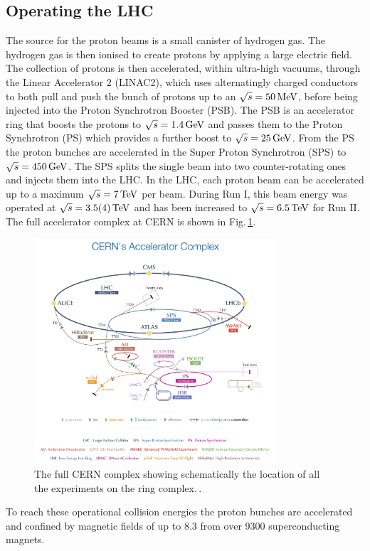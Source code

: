 \subsection{Operating the LHC}
\label{ssec:LHCoperation}

The source for the proton beams is a small canister of hydrogen gas. 
The hydrogen gas is then ionised to create protons by applying a large electric field.
The collection of protons is then accelerated, within ultra-high vacuums, through the Linear Accelerator 2 (LINAC2), which uses alternatingly charged conductors to both pull and push the bunch of protons up to an $\sqrt{s}=50\,\text{Me\hspace{-.08em}V}$, before being injected into the Proton Synchrotron Booster (PSB).
The PSB is an accelerator ring that boosts the protons to $\sqrt{s}=1.4\,\text{Ge\hspace{-.08em}V}$ and passes them to the Proton Synchrotron (PS) which provides a further boost to $\sqrt{s}=25\,\text{Ge\hspace{-.08em}V}$.
From the PS the proton bunches are accelerated in the Super Proton Synchrotron (SPS) to $\sqrt{s}=450\,\text{Ge\hspace{-.08em}V}$. 
The SPS splits the single beam into two counter-rotating ones and injects them into the LHC.
In the LHC, each proton beam can be accelerated up to a maximum $\sqrt{s}=7\,\text{Te\hspace{-.08em}V}$ per beam. 
During Run I, this beam energy was operated at $\sqrt{s}=3.5(4)\,\text{Te\hspace{-.08em}V}$ and has been increased to $\sqrt{s}=6.5\,\text{Te\hspace{-.08em}V}$ for Run II. 
The full accelerator complex at CERN is shown in Fig.\,\ref{fig:CERNcomplex}.
\begin{figure}[htpb]
	\centering
	\includegraphics[width=0.8\textwidth, rotate=90]{Figures/CERNcomplex}
	\caption[The full CERN complex showing schematically the location of all the experiments on the ring complex.]{The full CERN complex showing schematically the location of all the experiments on the ring complex.\,\cite{CERNcomplex}. }
	\label{fig:CERNcomplex}
\end{figure}
To reach these operational collision energies the proton bunches are accelerated and confined by magnetic fields of up to 8.3\Tesla{} from over 9300 superconducting magnets. 

